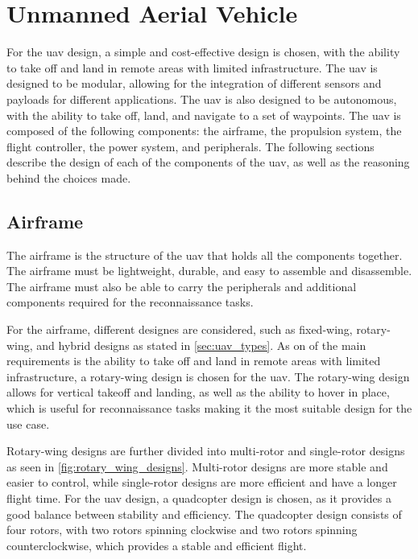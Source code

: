 \section{Unmanned Aerial Vehicle}\label{sec:design_uav}

For the \gls{uav} design, a simple and cost-effective design is chosen, with the ability to take off and land in remote areas with limited infrastructure. The \gls{uav} is designed to be modular, allowing for the integration of different sensors and payloads for different applications. The \gls{uav} is also designed to be autonomous, with the ability to take off, land, and navigate to a set of waypoints. The \gls{uav} is composed of the following components: the airframe, the propulsion system, the flight controller, the power system, and peripherals. The following sections describe the design of each of the components of the \gls{uav}, as well as the reasoning behind the choices made.


\subsection{Airframe}\label{subsec:design_airframe}

The airframe is the structure of the \gls{uav} that holds all the components together. The airframe must be lightweight, durable, and easy to assemble and disassemble. The airframe must also be able to carry the peripherals and additional components required for the reconnaissance tasks.

For the airframe, different designes are considered, such as fixed-wing, rotary-wing, and hybrid designs as stated in \cref{sec:uav_types}. As on of the main requirements is the ability to take off and land in remote areas with limited infrastructure, a rotary-wing design is chosen for the \gls{uav}. The rotary-wing design allows for vertical takeoff and landing, as well as the ability to hover in place, which is useful for reconnaissance tasks making it the most suitable design for the use case.

Rotary-wing designs are further divided into multi-rotor and single-rotor designs as seen in \cref{fig:rotary_wing_designs}. Multi-rotor designs are more stable and easier to control, while single-rotor designs are more efficient and have a longer flight time. For the \gls{uav} design, a quadcopter design is chosen, as it provides a good balance between stability and efficiency. The quadcopter design consists of four rotors, with two rotors spinning clockwise and two rotors spinning counterclockwise, which provides a stable and efficient flight.

